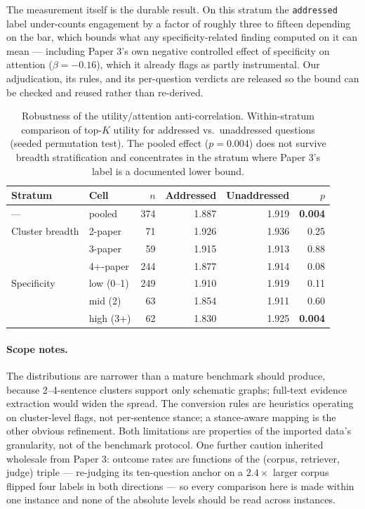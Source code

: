 \documentclass[11pt]{article}
\begin{document}
The measurement itself is the durable result. On this stratum the
\texttt{addressed} label under-counts engagement by a factor of roughly
three to fifteen depending on the bar, which bounds what any
specificity-related finding computed on it can mean --- including Paper
3's own negative controlled effect of specificity on attention
($\beta = -0.16$), which it already flags as partly instrumental. Our
adjudication, its rules, and its per-question verdicts are released so
the bound can be checked and reused rather than re-derived.

\begin{table}[t]
\centering
\caption{Robustness of the utility/attention anti-correlation.
Within-stratum comparison of top-$K$ utility for addressed vs.\
unaddressed questions (seeded permutation test). The pooled effect
($p = 0.004$) does not survive breadth stratification and concentrates
in the stratum where Paper 3's label is a documented lower bound.}
\label{tab:robust}
\begin{tabular}{llrrrr}
\toprule
Stratum & Cell & $n$ & Addressed & Unaddressed & $p$ \\
\midrule
--- & pooled & 374 & 1.887 & 1.919 & \textbf{0.004} \\
\midrule
Cluster breadth & 2-paper & 71 & 1.926 & 1.936 & 0.25 \\
                & 3-paper & 59 & 1.915 & 1.913 & 0.88 \\
                & 4+-paper & 244 & 1.877 & 1.914 & 0.08 \\
\midrule
Specificity & low (0--1) & 249 & 1.910 & 1.919 & 0.11 \\
            & mid (2) & 63 & 1.854 & 1.911 & 0.60 \\
            & high (3+) & 62 & 1.830 & 1.925 & \textbf{0.004} \\
\bottomrule
\end{tabular}
\end{table}

\paragraph{Scope notes.} The distributions are narrower than a mature
benchmark should produce, because 2--4-sentence clusters support only
schematic graphs; full-text evidence extraction would widen the spread.
The conversion rules are heuristics operating on cluster-level flags,
not per-sentence stance; a stance-aware mapping is the other obvious
refinement. Both limitations are properties of the imported data's
granularity, not of the benchmark protocol. One further caution
inherited wholesale from Paper 3: outcome rates are functions of the
(corpus, retriever, judge) triple --- re-judging its ten-question
anchor on a $2.4\times$ larger corpus flipped four labels in both
directions --- so every comparison here is made within one instance and
none of the absolute levels should be read across instances.
\end{document}
